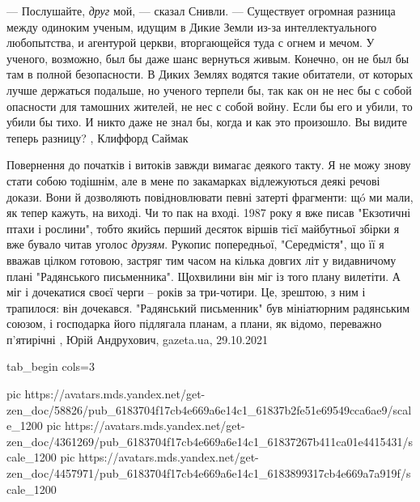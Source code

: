 — Послушайте, \emph{друг} мой, — сказал Снивли. — Существует огромная разница между
одиноким ученым, идущим в Дикие Земли из-за интеллектуального любопытства, и
агентурой церкви, вторгающейся туда с огнем и мечом. У ученого, возможно, был
бы даже шанс вернуться живым. Конечно, он не был бы там в полной безопасности.
В Диких Землях водятся такие обитатели, от которых лучше держаться подальше, но
ученого терпели бы, так как он не нес бы с собой опасности для тамошних
жителей, не нес с собой войну. Если бы его и убили, то убили бы тихо. И никто
даже не знал бы, когда и как это произошло. Вы видите теперь разницу?
, Клиффорд Саймак

Повернення до початків і витоків завжди вимагає деякого такту. Я не можу знову
стати собою тодішнім, але в мене по закамарках відлежуються деякі речові
докази.  Вони й дозволяють повідновлювати певні затерті фрагменти: щó ми мали,
як тепер кажуть, на виході. Чи то пак на вході.  1987 року я вже писав
"Екзотичні птахи і рослини", тобто якийсь перший десяток віршів тієї майбутньої
збірки я вже бувало читав уголос \emph{друзям}. Рукопис попередньої, "Середмістя", що
її я вважав цілком готовою, застряг тим часом на кілька довгих літ у
видавничому плані "Радянського письменника". Щохвилини він міг із того плану
вилетіти. А міг і дочекатися своєї черги – років за три-чотири. Це, зрештою, з
ним і трапилося: він дочекався. "Радянський письменник" був мініатюрним
радянським союзом, і господарка його підлягала планам, а плани, як відомо,
переважно п'ятирічні
, 
Юрій Андрухович, gazeta.ua, 29.10.2021

\ifcmt
  tab_begin cols=3

     pic https://avatars.mds.yandex.net/get-zen_doc/58826/pub_6183704f17cb4e669a6e14c1_61837b2fe51e69549cca6ae9/scale_1200
     pic https://avatars.mds.yandex.net/get-zen_doc/4361269/pub_6183704f17cb4e669a6e14c1_61837267b411ca01e4415431/scale_1200
		 pic https://avatars.mds.yandex.net/get-zen_doc/4457971/pub_6183704f17cb4e669a6e14c1_6183899317cb4e669a7a919f/scale_1200

